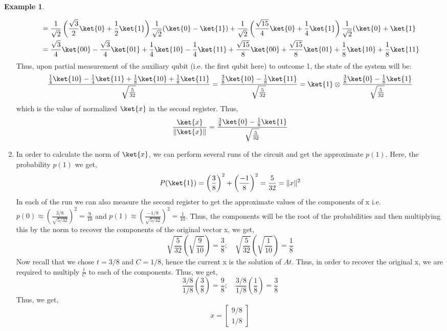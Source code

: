 \documentclass[12pt, oneside]{book}
\theoremstyle{definition}
\theoremstyle{definition}
\newtheorem{example}{Example}[section]
\theoremstyle{remark}
\begin{document}
\begin{example}
\begin{enumerate}
    \begin{align*}
    &=\frac{1}{\sqrt{2}}\left(\frac{\sqrt{3}}{2}\ket{0}+\frac{1}{2}\ket{1}\right)\frac{1}{\sqrt{2}}(\ket{0}-\ket{1})+\frac{1}{\sqrt{2}}\left(\frac{\sqrt{15}}{4}\ket{0}+\frac{1}{4}\ket{1}\right)\frac{1}{\sqrt{2}}(\ket{0}+\ket{1}\\
    &=\frac{\sqrt{3}}{4}\ket{00}-\frac{\sqrt{3}}{4}\ket{01}+\frac{1}{4}\ket{10}-\frac{1}{4}\ket{11}+\frac{\sqrt{15}}{8}\ket{00}+\frac{\sqrt{15}}{8}\ket{01}+\frac{1}{8}\ket{10}+\frac{1}{8}\ket{11}
    \end{align*}
    Thus, upon partial measurement of the auxiliary qubit (i.e. the first qubit here) to outcome 1, the state of the system will be:
    \[
    \frac{\frac{1}{4}\ket{10}-\frac{1}{4}\ket{11}+\frac{1}{8}\ket{10}+\frac{1}{8}\ket{11}}{\sqrt{\frac{5}{32}}}=\frac{\frac{3}{8}\ket{10}-\frac{1}{8}\ket{11}}{\sqrt{\frac{5}{32}}}=\ket{1}\otimes \frac{\frac{3}{8}\ket{0}-\frac{1}{8}\ket{1}}{\sqrt{\frac{5}{32}}}
    \]
    which is the value of normalized $\ket{x}$ in the second register. Thus,
    \[
    \frac{\ket{x}}{\|\ket{x}\|}=\frac{\frac{3}{8}\ket{0}-\frac{1}{8}\ket{1}}{\sqrt{\frac{5}{32}}}
    \]
    \item In order to calculate the norm of $\ket{x}$, we can perform several runs of the circuit and get the approximate $p(1)$. Here, the probability $p(1)$ we get,
    \[
    P(\ket{1})=\left(\frac{3}{8}\right)^2+\left(\frac{-1}{8}\right)^2=\frac{5}{32}=\|x\|^2
    \]
    In each of the run we can also measure the second register to get the approximate values of the components of x i.e. $p(0)\approx \left(\frac{3/8}{\sqrt{5/32}}\right)^2=\frac{9}{10}$ and $p(1)\approx \left(\frac{-1/8}{\sqrt{5/32}}\right)^2=\frac{1}{10}$. Thus, the components will be the root of the probabilities and then multiplying this by the norm to recover the components of the original vector x, we get,
    \[
    \sqrt{\frac{5}{32}}\left(\sqrt{\frac{9}{10}}\right)=\frac{3}{8}; \quad \sqrt{\frac{5}{32}}\left(\sqrt{\frac{1}{10}}\right)=\frac{1}{8}
    \]
    Now recall that we chose $t=3/8$ and $C=1/8$, hence the current x is the solution of $At$. Thus, in order to recover the original x, we are required to multiply $\frac{t}{C}$ to each of the components. Thus, we get,
    \[
    \frac{3/8}{1/8}\left(\frac{3}{8}\right)=\frac{9}{8}; \quad \frac{3/8}{1/8}\left(\frac{1}{8}\right)=\frac{3}{8}
    \]
    Thus, we get,
    \[
    x=\begin{bmatrix} 9/8 \\ 1/8 \end{bmatrix}
\]
\end{enumerate}
\end{example}
\end{document}
